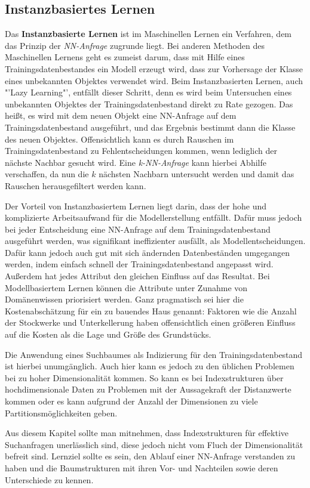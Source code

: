 \subsection{Instanzbasiertes Lernen}
Das \textbf{Instanzbasierte Lernen} ist im Maschinellen Lernen ein Verfahren, dem
das Prinzip der \textit{NN-Anfrage} zugrunde liegt. Bei anderen Methoden des
Maschinellen Lernens geht es zumeist darum, dass mit Hilfe eines Trainingsdatenbestandes
ein Modell erzeugt wird, dass zur Vorhersage der Klasse eines unbekannten Objektes
verwendet wird. Beim Instanzbasierten Lernen, auch "'Lazy Learning"', entfällt
dieser Schritt, denn es wird beim Untersuchen eines unbekannten Objektes der
Trainingsdatenbestand direkt zu Rate gezogen. Das heißt, es wird mit dem neuen
Objekt eine NN-Anfrage auf dem Trainingsdatenbestand ausgeführt, und das Ergebnis
bestimmt dann die Klasse des neuen Objektes. Offensichtlich kann es durch Rauschen im
Trainingsdatenbestand zu Fehlentscheidungen kommen, wenn lediglich der nächste Nachbar
gesucht wird. Eine \textit{k-NN-Anfrage} kann hierbei Abhilfe verschaffen, da nun die
\(k\) nächsten Nachbarn untersucht werden und damit das Rauschen herausgefiltert werden
kann.

Der Vorteil von Instanzbasiertem Lernen liegt darin, dass der hohe und komplizierte
Arbeitsaufwand für die Modellerstellung entfällt. Dafür muss jedoch bei jeder
Entscheidung eine NN-Anfrage auf dem Trainingsdatenbestand ausgeführt werden, was
signifikant ineffizienter ausfällt, als Modellentscheidungen. Dafür kann jedoch auch
gut mit sich ändernden Datenbeständen umgegangen werden, indem einfach schnell der
Trainingsdatenbestand angepasst wird. Außerdem hat jedes Attribut den gleichen Einfluss
auf das Resultat. Bei Modellbasiertem Lernen können die Attribute unter Zunahme
von Domänenwissen priorisiert werden. Ganz pragmatisch sei hier die Kostenabschätzung
für ein zu bauendes Haus genannt: Faktoren wie die Anzahl der Stockwerke und 
Unterkellerung haben offensichtlich einen größeren Einfluss auf die Kosten als
die Lage und Größe des Grundstücks.

Die Anwendung eines Suchbaumes als Indizierung für den Trainingsdatenbestand ist
hierbei unumgänglich. Auch hier kann es jedoch zu den üblichen Problemen bei zu
hoher Dimensionalität kommen. So kann es bei Indexstrukturen über hochdimensionale
Daten zu Problemen mit der Aussagekraft der Distanzwerte kommen oder es kann aufgrund
der Anzahl der Dimensionen zu viele Partitionsmöglichkeiten geben.

Aus diesem Kapitel sollte man mitnehmen, dass Indexstrukturen für effektive
Suchanfragen unerlässlich sind, diese jedoch nicht vom Fluch der Dimensionalität
befreit sind. Lernziel sollte es sein, den Ablauf einer NN-Anfrage verstanden zu
haben und die Baumstrukturen mit ihren Vor- und Nachteilen sowie deren Unterschiede
zu kennen.
